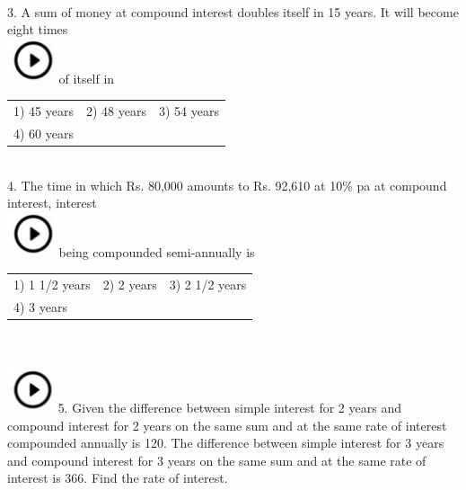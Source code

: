 \documentclass{article}
\begin{document}
	\noindent  \\  
	
	3.   A sum of money at compound interest doubles itself in 15 years. It will become eight times \noindent \\ \includegraphics*[width=0.60in, height=0.52in]{images/image1}of itself in
	
	\noindent \begin{tabular}{p{1.7in} p{1.6in} p{1.6in}} \\ 
 1) 45 years             & 2) 48 years       & 3) 54 years       \\
4) 60 years \\
\end{tabular}
	
	\noindent 
	
	\noindent 
	
	\noindent  \\  
	
	4.   The time in which Rs. 80,000 amounts to Rs. 92,610 at 10\% pa at compound interest, interest \noindent \\ \includegraphics*[width=0.60in, height=0.52in]{images/image1}being compounded semi-annually is
	
	\noindent \begin{tabular}{p{1.7in} p{1.6in} p{1.6in}} \\ 
 1) 1 1/2 years         & 2) 2 years         & 3) 2 1/2 years   \\
4) 3 years \\
\end{tabular}
	
	\noindent 
	
	\noindent 
	
	\noindent 
	
	\noindent 
	
	\noindent 
	
	\noindent  \\  
	
	\noindent \noindent \\ \includegraphics*[width=0.59in, height=0.52in]{images/image1}5.   Given the difference between simple interest for 2 years and compound interest for 2 years on the same sum and at the same rate of interest compounded annually is 120. The difference between simple interest for 3 years and compound interest for 3 years on the same sum and at the same rate of interest is 366. Find the rate of interest.
	
\end{document}
